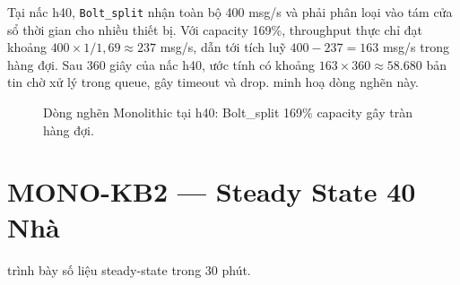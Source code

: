 \documentclass[13pt,a4paper]{report}
\newcommand{\code}[1]{\texttt{\small #1}}
\begin{document}
Tại nấc h40, \code{Bolt\_split} nhận toàn bộ 400 msg/s và phải phân loại vào tám
cửa sổ thời gian cho nhiều thiết bị. Với capacity 169\%, throughput thực chỉ đạt
khoảng $400 \times 1/1{,}69 \approx 237$ msg/s, dẫn tới tích luỹ
$400 - 237 = 163$ msg/s trong hàng đợi. Sau 360 giây của nấc h40, ước tính có
khoảng $163 \times 360 \approx 58.680$ bản tin chờ xử lý trong queue, gây timeout
và drop.  minh hoạ dòng nghẽn này.

\begin{figure}[H]
\centering
{}
\caption{Dòng nghẽn Monolithic tại h40: Bolt\_split 169\% capacity gây tràn hàng đợi.}
\label{fig:mono-bottleneck}
\end{figure}

\section{MONO-KB2 --- Steady State 40 Nhà}

 trình bày số liệu steady-state trong 30 phút.
\end{document}
